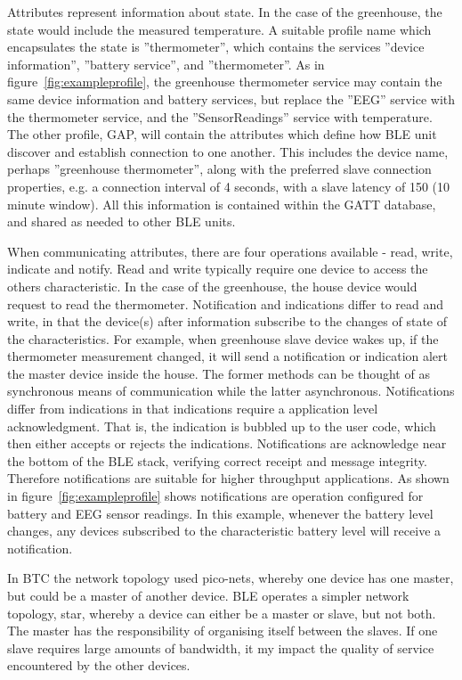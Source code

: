 \documentclass[]{article}
\begin{document}
 Attributes represent information about state. In the case of the greenhouse, the state would include the measured temperature. A suitable profile name which encapsulates the state is ''thermometer'', which contains the services ''device information'', ''battery service'', and ''thermometer''. As in figure~\ref{fig:exampleprofile}, the greenhouse thermometer service may contain the same device information and battery services, but replace the ''EEG'' service with the thermometer service, and the ''SensorReadings'' service with temperature. The other profile, \ac{GAP}, will contain the attributes which define how \ac{BLE} unit discover and establish connection to one another.  This includes the device name, perhaps ''greenhouse thermometer'', along with the preferred slave connection properties, e.g. a connection interval of 4 seconds, with a slave latency of 150 (10 minute window). All this information is contained within the GATT database, and shared as needed to other \ac{BLE} units. 

When communicating attributes, there are four operations available - read, write, indicate and notify. Read and write typically require one device to access the others characteristic. In the case of the greenhouse, the house device would request to read the thermometer. Notification and indications differ to read and write, in that the device(s) after information subscribe to the changes of state of the characteristics. For example, when greenhouse slave device wakes up, if the thermometer measurement changed, it will send a notification or indication alert the master device inside the house. The former methods can be thought of as synchronous means of communication while the latter asynchronous. Notifications differ from indications in that indications require a application level acknowledgment. That is, the indication is bubbled up to the user code, which then either accepts or rejects the indications. Notifications are acknowledge near the bottom of the \ac{BLE} stack, verifying correct receipt and message integrity. Therefore notifications are suitable for higher throughput applications. As shown in figure~\ref{fig:exampleprofile} shows notifications are operation configured for battery and EEG sensor readings. In this example, whenever the battery level changes, any devices subscribed to the characteristic battery level will receive a notification.

In \ac{BTC} the network topology used pico-nets, whereby one device has one master, but could be a master of another device. \ac{BLE} operates a simpler network topology, star, whereby a device can either be a master or slave, but not both. The master has the responsibility of organising itself between the slaves. If one slave requires large amounts of bandwidth, it my impact the quality of service encountered by the other devices. 
\end{document}
